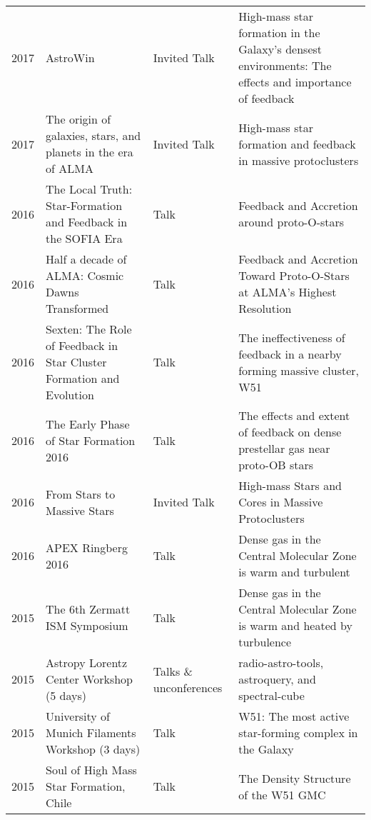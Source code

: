 \begin{tabular}{cp{1.8in}p{1.5cm}p{3.0in}}
    2017 &      AstroWin & Invited Talk & High-mass star formation in the Galaxy's densest environments: The effects and importance of feedback\\
    2017 &      The origin of galaxies, stars, and planets in the era of ALMA & Invited Talk & High-mass star formation and feedback in massive protoclusters \\
    2016 &      The Local Truth: Star-Formation and Feedback in the SOFIA Era & Talk & Feedback and Accretion around proto-O-stars \\
    2016 &      Half a decade of ALMA: Cosmic Dawns Transformed & Talk & Feedback and Accretion Toward Proto-O-Stars at ALMA's Highest Resolution \\
    2016 &      Sexten: The Role of Feedback in Star Cluster Formation and Evolution  & Talk & The ineffectiveness of feedback in a nearby forming massive cluster, W51 \\
    2016 &      The Early Phase of Star Formation 2016 & Talk & The effects and extent of feedback on dense prestellar gas near proto-OB stars \\
    2016 &      From Stars to Massive Stars & Invited Talk & High-mass Stars and Cores in Massive Protoclusters \\
    2016 &      APEX Ringberg 2016 & Talk & Dense gas in the Central Molecular Zone is warm and turbulent \\
    2015 &      The 6th Zermatt ISM Symposium & Talk & Dense gas in the Central Molecular Zone is warm and heated by turbulence \\
    2015 &      Astropy Lorentz Center Workshop (5 days) & Talks \& unconferences & radio-astro-tools, astroquery, and spectral-cube \\ 
    2015 &      University of Munich Filaments Workshop (3 days) & Talk & W51: The most active star-forming complex in the Galaxy \\
    2015 &      Soul of High Mass Star Formation, Chile & Talk & The Density Structure of the W51 GMC \\

\end{tabular}
